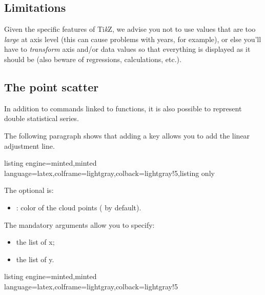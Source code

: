 \documentclass[11pt,a4paper]{ltxdoc}
\providecommand\tikzlogo{Ti\textit{k}Z}
\let\TikZ\tikzlogo
\begin{document}
\subsection{Limitations}

Given the specific features of \TikZ, we advise you not to use values that are too \textit{large} at axis level (this can cause problems with years, for example), or else you'll have to \textit{transform} axis and/or data values so that everything is displayed as it should be (also beware of regressions, calculations, etc.).

\subsection{The point scatter}\label{scatter}

In addition to commands linked to functions, it is also possible to represent double statistical series.

\smallskip

The following paragraph shows that adding a key allows you to add the linear adjustment line.

\begin{tcblisting}{listing engine=minted,minted language=latex,colframe=lightgray,colback=lightgray!5,listing only}
\end{tcblisting}

The optional \MontreCode{[key]} is:

\smallskip

\begin{itemize}
	\item {}: color of the cloud points ( by default).
\end{itemize}

\smallskip

The mandatory arguments allow you to specify:

\smallskip

\begin{itemize}
	\item the list of x;
	\item the list of y.
\end{itemize}

\begin{tcblisting}{listing engine=minted,minted language=latex,colframe=lightgray,colback=lightgray!5}
\begin{GraphTikz}%
	[x=0.075cm,y=0.03cm,Xmin=0,Xmax=160,Xgrid=20,Xgrids=10,
	Origy=250,Ymin=250,Ymax=400,Ygrid=25,Ygrids=5]
\end{GraphTikz}
\end{tcblisting}
\end{document}
